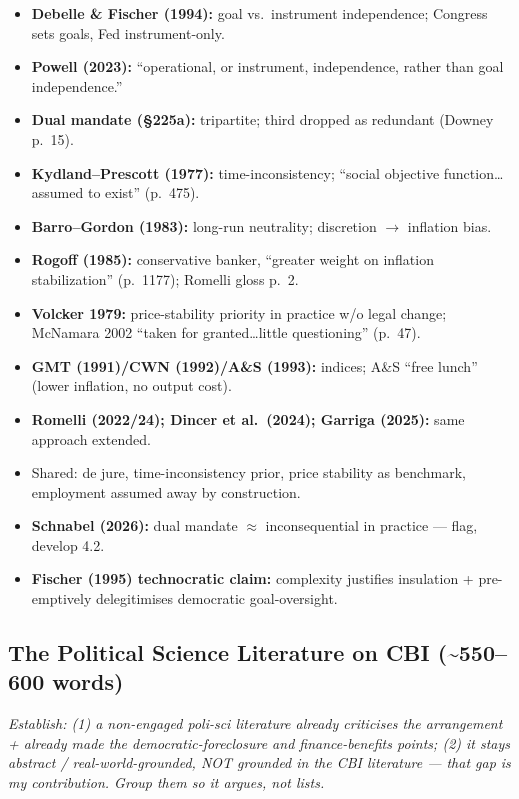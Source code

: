 \documentclass[12pt,a4paper]{article}
\begin{document}
\begin{doublespace}
\begin{itemize}
    \item \textbf{Debelle \& Fischer (1994):} goal vs.\ instrument independence; Congress sets goals, Fed instrument-only.
    \item \textbf{Powell (2023):} ``operational, or instrument, independence, rather than goal independence.''
    \item \textbf{Dual mandate (\S225a):} tripartite; third dropped as redundant (Downey p.\ 15).
    \item \textbf{Kydland--Prescott (1977):} time-inconsistency; ``social objective function\ldots assumed to exist'' (p.\ 475).
    \item \textbf{Barro--Gordon (1983):} long-run neutrality; discretion $\rightarrow$ inflation bias.
    \item \textbf{Rogoff (1985):} conservative banker, ``greater weight on inflation stabilization'' (p.\ 1177); Romelli gloss p.\ 2.
    \item \textbf{Volcker 1979:} price-stability priority in practice w/o legal change; McNamara 2002 ``taken for granted\ldots little questioning'' (p.\ 47).
    \item \textbf{GMT (1991)/CWN (1992)/A\&S (1993):} indices; A\&S ``free lunch'' (lower inflation, no output cost).
    \item \textbf{Romelli (2022/24); Dincer et al.\ (2024); Garriga (2025):} same approach extended.
    \item Shared: de jure, time-inconsistency prior, price stability as benchmark, employment assumed away by construction.
    \item \textbf{Schnabel (2026):} dual mandate $\approx$ inconsequential in practice --- flag, develop 4.2.
    \item \textbf{Fischer (1995) technocratic claim:} complexity justifies insulation + pre-emptively delegitimises democratic goal-oversight.
\end{itemize}

\subsection{The Political Science Literature on CBI (\textasciitilde550--600 words)}

\textit{Establish: (1) a non-engaged poli-sci literature already criticises the arrangement + already made the democratic-foreclosure and finance-benefits points; (2) it stays abstract / real-world-grounded, NOT grounded in the CBI literature --- that gap is my contribution. Group them so it argues, not lists.}


\end{doublespace}
\end{document}
